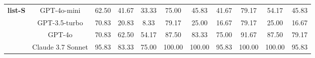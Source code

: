 \begin{table}[t]
\begin{adjustbox}{max width=\textwidth}
\begin{tabular}{cc ccc ccc ccc}
\multirow{4}{*}{\textbf{list-S}}
 & GPT-4o-mini & 62.50 & 41.67 & 33.33 & 75.00 & 45.83 & 41.67 & 79.17 & 54.17 & 45.83 \\
 & GPT-3.5-turbo & 70.83 & 20.83 & 8.33 & 79.17 & 25.00 & 16.67 & 79.17 & 25.00 & 16.67 \\
 & GPT-4o & 70.83 & 62.50 & 54.17 & 87.50 & 83.33 & 75.00 & 91.67 & 87.50 & 79.17 \\
 & Claude 3.7 Sonnet & 95.83 & 83.33 & 75.00 & 100.00 & 100.00 & 95.83 & 100.00 & 100.00 & 95.83 \\
\bottomrule
\end{tabular}
\end{adjustbox}
\end{table}
